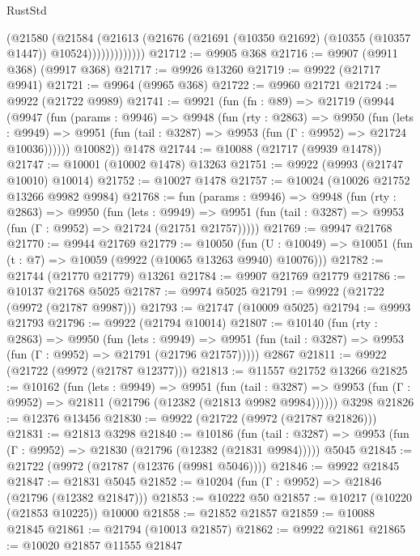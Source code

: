 \begin{lexlean}{RustStd}
\begin{coremodule}
                    (@21580
                      (@21584
                        (@21613
                          (@21676
                            (@21691 (@10350 @21692) (@10355 (@10357 @1447)) @10524)))))))))))))
@21712 := @9905 @368
@21716 := @9907 (@9911 @368) (@9917 @368)
@21717 := @9926 @13260
@21719 := @9922 (@21717 @9941)
@21721 := @9964 (@9965 @368)
@21722 := @9960 @21721
@21724 := @9922 (@21722 @9989)
@21741 := @9921
    (fun (fn : @89) =>
    @21719
      (@9944
        (@9947
          (fun (params : @9946) =>
          @9948
            (fun (rty : @2863) =>
            @9950
              (fun (lets : @9949) =>
              @9951 (fun (tail : @3287) => @9953 (fun (Γ : @9952) => @21724 @10036))))))
        @10082))
    @1478
@21744 := @10088 (@21717 (@9939 @1478))
@21747 := @10001 (@10002 @1478) @13263
@21751 := @9922 (@9993 (@21747 @10010) @10014)
@21752 := @10027 @1478
@21757 := @10024 (@10026 @21752 @13266 @9982 @9984)
@21768 := fun (params : @9946) =>
  @9948
    (fun (rty : @2863) =>
    @9950
      (fun (lets : @9949) =>
      @9951 (fun (tail : @3287) => @9953 (fun (Γ : @9952) => @21724 (@21751 @21757)))))
@21769 := @9947 @21768
@21770 := @9944 @21769
@21779 := @10050
    (fun (U : @10049) => @10051 (fun (t : @7) => @10059 (@9922 (@10065 @13263 @9940) @10076)))
@21782 := @21744 (@21770 @21779) @13261
@21784 := @9907 @21769 @21779
@21786 := @10137 @21768 @5025
@21787 := @9974 @5025
@21791 := @9922 (@21722 (@9972 (@21787 @9987)))
@21793 := @21747 (@10009 @5025)
@21794 := @9993 @21793
@21796 := @9922 (@21794 @10014)
@21807 := @10140
    (fun (rty : @2863) =>
    @9950
      (fun (lets : @9949) =>
      @9951 (fun (tail : @3287) => @9953 (fun (Γ : @9952) => @21791 (@21796 @21757)))))
    @2867
@21811 := @9922 (@21722 (@9972 (@21787 @12377)))
@21813 := @11557 @21752 @13266
@21825 := @10162
    (fun (lets : @9949) =>
    @9951
      (fun (tail : @3287) =>
      @9953 (fun (Γ : @9952) => @21811 (@21796 (@12382 (@21813 @9982 @9984))))))
    @3298
@21826 := @12376 @13456
@21830 := @9922 (@21722 (@9972 (@21787 @21826)))
@21831 := @21813 @3298
@21840 := @10186
    (fun (tail : @3287) => @9953 (fun (Γ : @9952) => @21830 (@21796 (@12382 (@21831 @9984)))))
    @5045
@21845 := @21722 (@9972 (@21787 (@12376 (@9981 @5046))))
@21846 := @9922 @21845
@21847 := @21831 @5045
@21852 := @10204 (fun (Γ : @9952) => @21846 (@21796 (@12382 @21847)))
@21853 := @10222 @50
@21857 := @10217 (@10220 (@21853 @10225)) @10000
@21858 := @21852 @21857
@21859 := @10088 @21845
@21861 := @21794 (@10013 @21857)
@21862 := @9922 @21861
@21865 := @10020 @21857 @11555 @21847

\end{coremodule}
\end{lexlean}
